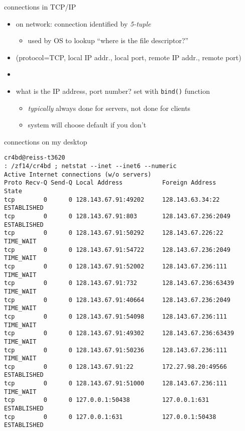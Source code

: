 \begin{frame}{connections in TCP/IP}
    \begin{itemize}
    \item on network: connection identified by \textit{5-tuple}
        \begin{itemize}
        \item used by OS to lookup ``where is the file descriptor?''
        \end{itemize}
    \item \small(protocol=TCP, local IP addr., local port, remote IP addr., remote port)
    \item {}
    \vspace{.5cm}
    \item what is the IP address, port number? set with \texttt{bind()} function
        \begin{itemize}
        \item \textit{typically} always done for servers, not done for clients
        \item system will choose default if you don't
        \end{itemize}
    \end{itemize}
\end{frame}

\begin{frame}[fragile,label=laptopNetstat]{connections on my desktop}
\begin{lstlisting}[language={},basicstyle=\fontsize{9.5}{10.5}\selectfont]
cr4bd@reiss-t3620
: /zf14/cr4bd ; netstat --inet --inet6 --numeric
Active Internet connections (w/o servers)
Proto Recv-Q Send-Q Local Address           Foreign Address         State      
tcp        0      0 128.143.67.91:49202     128.143.63.34:22        ESTABLISHED
tcp        0      0 128.143.67.91:803       128.143.67.236:2049     ESTABLISHED
tcp        0      0 128.143.67.91:50292     128.143.67.226:22       TIME_WAIT  
tcp        0      0 128.143.67.91:54722     128.143.67.236:2049     TIME_WAIT  
tcp        0      0 128.143.67.91:52002     128.143.67.236:111      TIME_WAIT  
tcp        0      0 128.143.67.91:732       128.143.67.236:63439    TIME_WAIT  
tcp        0      0 128.143.67.91:40664     128.143.67.236:2049     TIME_WAIT  
tcp        0      0 128.143.67.91:54098     128.143.67.236:111      TIME_WAIT  
tcp        0      0 128.143.67.91:49302     128.143.67.236:63439    TIME_WAIT  
tcp        0      0 128.143.67.91:50236     128.143.67.236:111      TIME_WAIT  
tcp        0      0 128.143.67.91:22        172.27.98.20:49566      ESTABLISHED
tcp        0      0 128.143.67.91:51000     128.143.67.236:111      TIME_WAIT  
tcp        0      0 127.0.0.1:50438         127.0.0.1:631           ESTABLISHED
tcp        0      0 127.0.0.1:631           127.0.0.1:50438         ESTABLISHED
\end{lstlisting}
\end{frame}


